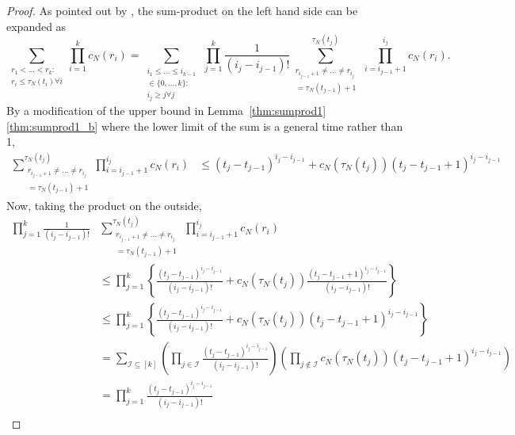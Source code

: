\begin{proof}
As pointed out by \textcite[p.~460]{mohle1999}, the sum-product on the left hand side can be expanded as
\begin{equation*}
\sum_{\substack{r_1<\dots<r_k :\\ r_i\leq \tau_N(t_i) \forall i}} 
        \prod_{i=1}^k c_N(r_i)
= \sum_{\substack{i_1\leq \dots\leq i_{k-1}\\ \in \{0,\dots,k\} :\\ 
        i_j \geq j \forall j}} \, \prod_{j=1}^k \frac{1}{(i_j - i_{j-1})!}
        \sum_{\substack{ r_{i_{j-1}+1} \neq \dots \neq r_{i_j} \\ = \tau_N(t_{j-1})+1}}        
        ^{\tau_N(t_j)}  \,\prod_{i=i_{j-1}+1}^{i_j} c_N(r_i) .
\end{equation*}
By a modification of the upper bound in Lemma~\ref{thm:sumprod1}\ref{thm:sumprod1_b} where the lower limit of the sum is a general time rather than 1,
\begin{align*}
\sum_{\substack{ r_{i_{j-1}+1} \neq \dots \neq r_{i_j} \\ = 
        \tau_N(t_{j-1})+1 }}^{\tau_N(t_j)}
        \prod_{i=i_{j-1}+1}^{i_j} c_N(r_i)
&\leq (t_j - t_{j-1})^{i_j - i_{j-1}} 
        + c_N(\tau_N(t_j)) ( t_j - t_{j-1} +1 )^{i_j - i_{j-1}}
\end{align*}
Now, taking the product on the outside,
\begin{align*}
\prod_{j=1}^k \frac{1}{(i_j - i_{j-1})!}
        &\sum_{\substack{ r_{i_{j-1}+1} \neq \dots \neq r_{i_j} \\ = \tau_N(t_{j-1})+1}}        
        ^{\tau_N(t_j)}  \,\prod_{i=i_{j-1}+1}^{i_j} c_N(r_i) \\
&\leq \prod_{j=1}^k \left\{ \frac{(t_j - t_{j-1})^{i_j - i_{j-1}}}{(i_j - i_{j-1})!}  
        + c_N(\tau_N(t_j)) \frac{( t_j - t_{j-1} +1 )^{i_j - i_{j-1}}}{(i_j - i_{j-1})!} \right\} 
        \\
&\leq \prod_{j=1}^k \left\{ \frac{(t_j - t_{j-1})^{i_j - i_{j-1}}}{(i_j - i_{j-1})!}  
        + c_N(\tau_N(t_j)) ( t_j - t_{j-1} +1 )^{i_j - i_{j-1}} \right\} \\
&= \sum_{\mathcal{I} \subseteq [k]} \left( \prod_{j\in\mathcal{I}} 
        \frac{(t_j - t_{j-1})^{i_j - i_{j-1}}}{(i_j - i_{j-1})!} \right)
        \left( \prod_{j\notin\mathcal{I}} c_N(\tau_N(t_j)) 
        ( t_j - t_{j-1} +1 )^{i_j - i_{j-1}} \right) \\
&= \prod_{j=1}^k \frac{(t_j - t_{j-1})^{i_j - i_{j-1}}}{(i_j - i_{j-1})!}  \\

\end{align*}
\end{proof}

